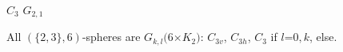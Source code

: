 \documentclass{beamer}
\begin{document}
\begin{frame}
\begin{center}
\begin{minipage}[b]{25mm}
{}\par
$C_{3}$  $G_{2,1}$ 
\end{minipage}
\end{center}
All $(\{2,3\},6)$-spheres are $G_{k,l}(6$$\times$$ K_2)$:  $C_{3v}$, 
$C_{3h}$, $C_3$ if $l$=$0,k$, else.

\end{frame}
\end{document}
